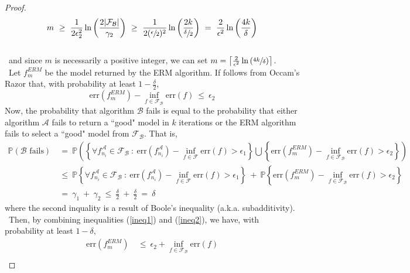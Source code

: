 \documentclass[twoside,11pt]{homework}
\DeclarePairedDelimiter{\2norm}{\lVert}{\rVert^2_2}
\newcommand{\1}[1]{\mathds{1}\left[#1\right]}
\begin{document}
\begin{proof}
$$m \ \geq \ \frac{1}{2\epsilon_2^2}\ln\left(\frac{2|\mathcal{F_{\mathcal{B}}}|}{\gamma_2}\right) \ \geq \ \frac{1}{2(\sfrac{\epsilon}{2})^2}\ln\left(\frac{2k}{\sfrac{\delta}{2}}\right) \ = \ \frac{2}{\epsilon^2}\ln\left(\frac{4k}{\delta}\right)$$ 
\\\
and since $m$ is necessarily a positive integer, we can set $m = \left\lceil\frac{2}{\epsilon^2}\ln\left(\sfrac{4k}{\delta}\right)\right\rceil$.  \\\
Let $f_m^{ERM}$ be the model returned by the ERM algorithm. If follows from Occam's Razor that, with probability at least $1 - \frac{\delta}{2}$, 
\begin{equation}\label{ineq2}
\text{err}\left(f_m^{ERM}\right) - \inf_{f \in \mathcal{F_{\mathcal{B}}}}\text{err}(f) \ \leq \ \epsilon_2
\end{equation}
Now, the probability that algorithm $\mathcal{B}$ fails is equal to the probability that either algorithm $\mathcal{A}$ fails to return a ``good" model in $k$ iterations or the ERM algorithm fails to select a ``good" model from $\mathcal{F}_{\mathcal{B}}$. That is,
\begin{align*}
\mathbb{P}(\mathcal{B} \text{ fails}) \ &= \ \mathbb{P}\left(\left\lbrace \forall f^{\mathcal{A}}_{n_i} \in \mathcal{F}_{\mathcal{B}} \ : \ \text{err}\left(f^{\mathcal{A}}_{n_i}\right) - \inf_{f \in \mathcal{F}}\text{err}(f)  > \epsilon_1\right\rbrace \bigcup  \left\lbrace\text{err}\left(f_m^{ERM}\right) - \inf_{f \in \mathcal{F_{\mathcal{B}}}}\text{err}(f)  > \epsilon_2\right\rbrace \right)\\[0.8em]
& \leq \ \mathbb{P}\left\lbrace \forall f^{\mathcal{A}}_{n_i} \in \mathcal{F}_{\mathcal{B}} \ : \ \text{err}\left(f^{\mathcal{A}}_{n_i}\right) - \inf_{f \in \mathcal{F}}\text{err}(f)  > \epsilon_1\right\rbrace \ + \  \mathbb{P}\left\lbrace\text{err}\left(f_m^{ERM}\right) - \inf_{f \in \mathcal{F_{\mathcal{B}}}}\text{err}(f)  > \epsilon_2\right\rbrace \\[0.8em]
& = \ \gamma_1 \ + \ \gamma_2 \ \leq \ \frac{\delta}{2} \ + \ \frac{\delta}{2} \ = \ \delta
\end{align*}
where the second inquality is a result of Boole's inequality (a.k.a. subadditivity).\\\
Then, by combining inequalities (\ref{ineq1}) and (\ref{ineq2}), we have, with probability at least $1 - \delta$,
\begin{align*}
\text{err}(f_m^{ERM})  \ &\leq \ \epsilon_2 + \inf_{f \in \mathcal{F_{\mathcal{B}}}}\text{err}(f)\\[0.5em]

\end{align*}
\end{proof}
\end{document}
